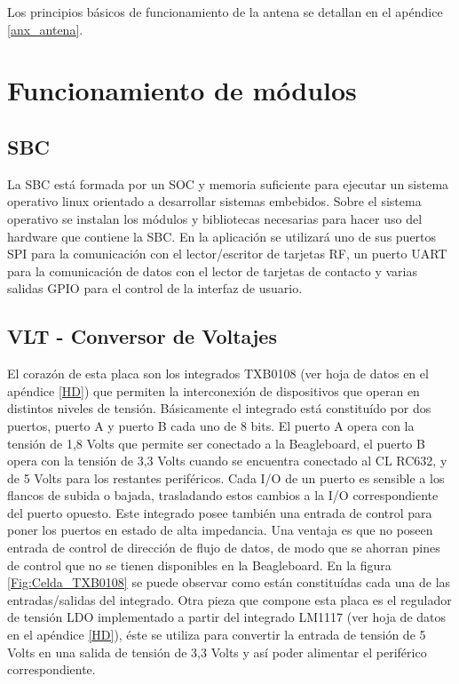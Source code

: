 Los principios básicos de funcionamiento de la antena se detallan en el apéndice \ref{anx_antena}.

\section{Funcionamiento de m\'odulos}

\subsection{SBC}
La SBC está formada por un SOC y memoria suficiente para ejecutar un sistema operativo linux orientado a desarrollar sistemas embebidos. Sobre el sistema operativo se instalan los módulos y bibliotecas necesarias para hacer uso del hardware que contiene la SBC. En la aplicación se utilizará uno de sus puertos SPI para la comunicación con el lector/escritor de tarjetas RF, un puerto UART para la comunicación de datos con el lector de tarjetas de contacto y varias salidas GPIO para el control de la interfaz de usuario.

\subsection{VLT - Conversor de Voltajes}
El corazón de esta placa son los integrados TXB0108 \cite{HD_VLT} (ver hoja de datos en el apéndice \ref{HD}) que permiten la interconexión de dispositivos que operan en distintos niveles de tensión. Básicamente el integrado está constituído por dos puertos, puerto A y puerto B cada uno de 8 bits. El puerto A opera con la tensión de 1,8 Volts que permite ser conectado a la Beagleboard, el puerto B opera con la tensión de 3,3 Volts cuando se encuentra conectado al CL RC632, y de 5 Volts para los restantes periféricos.
Cada I/O de un puerto es sensible a los flancos de subida o bajada, trasladando estos cambios a la I/O correspondiente del puerto opuesto. 
Este integrado posee también una entrada de control para poner los puertos en estado de alta impedancia.
Una ventaja es que no poseen entrada de control de dirección de flujo de datos, de modo que se ahorran pines de control que no se tienen disponibles en la Beagleboard.
En la figura \ref{Fig:Celda_TXB0108} se puede observar como están constituídas cada una de las entradas/salidas del integrado.
Otra pieza que compone esta placa es el regulador de tensión LDO implementado a partir del integrado LM1117 \cite{LDO} (ver hoja de datos en el apéndice \ref{HD}), éste se utiliza para convertir la entrada de tensión de 5 Volts en una salida de tensión de 3,3 Volts y así poder alimentar el periférico correspondiente.

